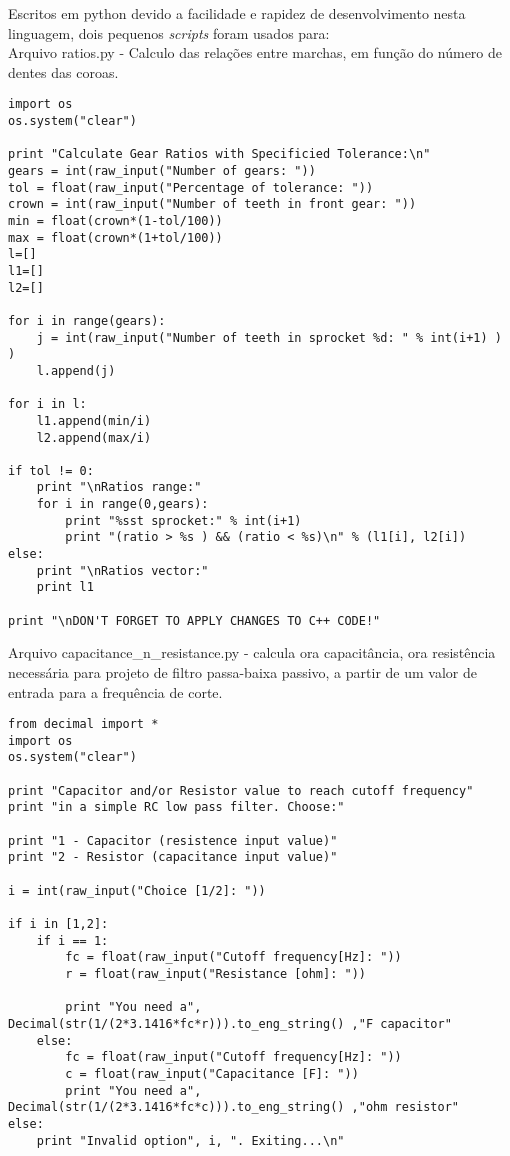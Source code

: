 \documentclass[a4paper,11pt]{article}
\begin{document}
Escritos em python\cite{python} devido a facilidade e rapidez de desenvolvimento nesta linguagem, dois pequenos \textit{scripts} foram usados para: \\
Arquivo ratios.py - Calculo das relações entre marchas, em função do número de dentes das coroas.
\begin{lstlisting}
import os
os.system("clear")

print "Calculate Gear Ratios with Specificied Tolerance:\n"
gears = int(raw_input("Number of gears: "))
tol = float(raw_input("Percentage of tolerance: "))
crown = int(raw_input("Number of teeth in front gear: "))
min = float(crown*(1-tol/100))
max = float(crown*(1+tol/100))
l=[]
l1=[]
l2=[]

for i in range(gears):
    j = int(raw_input("Number of teeth in sprocket %d: " % int(i+1) ) )
    l.append(j)

for i in l:
    l1.append(min/i)
    l2.append(max/i)

if tol != 0:
    print "\nRatios range:"
    for i in range(0,gears):
        print "%sst sprocket:" % int(i+1)
        print "(ratio > %s ) && (ratio < %s)\n" % (l1[i], l2[i])
else:
    print "\nRatios vector:"
    print l1

print "\nDON'T FORGET TO APPLY CHANGES TO C++ CODE!"
\end{lstlisting}

Arquivo capacitance\_n\_resistance.py - calcula ora capacitância, ora resistência necessária para projeto de filtro passa-baixa passivo, a partir de um valor de entrada para a frequência de corte.
\begin{lstlisting}
from decimal import *
import os
os.system("clear")

print "Capacitor and/or Resistor value to reach cutoff frequency"
print "in a simple RC low pass filter. Choose:"

print "1 - Capacitor (resistence input value)"
print "2 - Resistor (capacitance input value)"

i = int(raw_input("Choice [1/2]: "))

if i in [1,2]:
    if i == 1:
        fc = float(raw_input("Cutoff frequency[Hz]: "))
        r = float(raw_input("Resistance [ohm]: "))
        
        print "You need a", Decimal(str(1/(2*3.1416*fc*r))).to_eng_string() ,"F capacitor"
    else:
        fc = float(raw_input("Cutoff frequency[Hz]: "))
        c = float(raw_input("Capacitance [F]: "))
        print "You need a", Decimal(str(1/(2*3.1416*fc*c))).to_eng_string() ,"ohm resistor"
else:
    print "Invalid option", i, ". Exiting...\n"
\end{lstlisting}



\pagebreak
%


\end{document}
